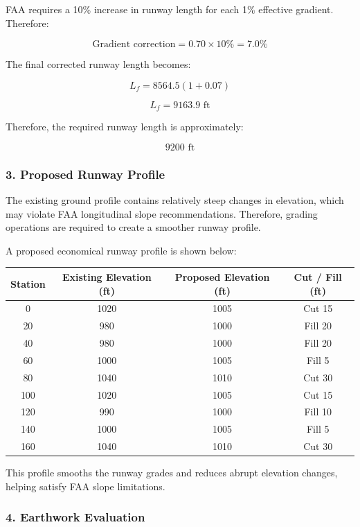 \documentclass{KPS_assignment}
\begin{document}
\begin{enumerate}
FAA requires a 10\% increase in runway length for each 1\% effective gradient. Therefore:

\[
\text{Gradient correction}
=
0.70 \times 10\%
=
7.0\%
\]

The final corrected runway length becomes:

\[
L_f
=
8564.5(1+0.07)
\]

\[
L_f
=
9163.9 \text{ ft}
\]

Therefore, the required runway length is approximately:

\[
\boxed{9200 \text{ ft}}
\]

\subsubsection*{3. Proposed Runway Profile}

The existing ground profile contains relatively steep changes in elevation, which may violate FAA longitudinal slope recommendations. Therefore, grading operations are required to create a smoother runway profile.

A proposed economical runway profile is shown below:

\begin{table}[h!]
\centering
\begin{tabular}{|c|c|c|c|}
\hline
\textbf{Station} & \textbf{Existing Elevation (ft)} & \textbf{Proposed Elevation (ft)} & \textbf{Cut / Fill (ft)} \\
\hline
0   & 1020 & 1005 & Cut 15 \\
20  & 980  & 1000 & Fill 20 \\
40  & 980  & 1000 & Fill 20 \\
60  & 1000 & 1005 & Fill 5 \\
80  & 1040 & 1010 & Cut 30 \\
100 & 1020 & 1005 & Cut 15 \\
120 & 990  & 1000 & Fill 10 \\
140 & 1000 & 1005 & Fill 5 \\
160 & 1040 & 1010 & Cut 30 \\
\hline
\end{tabular}
\end{table}

This profile smooths the runway grades and reduces abrupt elevation changes, helping satisfy FAA slope limitations.

\subsubsection*{4. Earthwork Evaluation}


\end{enumerate}
\end{document}
